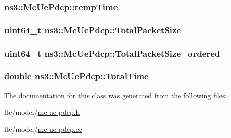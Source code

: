 \subsubsection[{\texorpdfstring{temp\+Time}{tempTime}}]{ ns3\+::\+Mc\+Ue\+Pdcp\+::temp\+Time\hspace{0.3cm}{\ttfamily [private]}}\hypertarget{classns3_1_1McUePdcp_a00eedb0b6b12304981937ffd8f153f1c}{}\label{classns3_1_1McUePdcp_a00eedb0b6b12304981937ffd8f153f1c}
\subsubsection[{\texorpdfstring{Total\+Packet\+Size}{TotalPacketSize}}]{\setlength{\rightskip}{0pt plus 5cm}uint64\+\_\+t ns3\+::\+Mc\+Ue\+Pdcp\+::\+Total\+Packet\+Size\hspace{0.3cm}{\ttfamily [private]}}\hypertarget{classns3_1_1McUePdcp_a5fe66d567481a6564a7d889cdf49da00}{}\label{classns3_1_1McUePdcp_a5fe66d567481a6564a7d889cdf49da00}
\subsubsection[{\texorpdfstring{Total\+Packet\+Size\+\_\+ordered}{TotalPacketSize_ordered}}]{\setlength{\rightskip}{0pt plus 5cm}uint64\+\_\+t ns3\+::\+Mc\+Ue\+Pdcp\+::\+Total\+Packet\+Size\+\_\+ordered\hspace{0.3cm}{\ttfamily [private]}}\hypertarget{classns3_1_1McUePdcp_a170d7342cb9d9fe7d213ae4a8d946d9c}{}\label{classns3_1_1McUePdcp_a170d7342cb9d9fe7d213ae4a8d946d9c}
\subsubsection[{\texorpdfstring{Total\+Time}{TotalTime}}]{\setlength{\rightskip}{0pt plus 5cm}double ns3\+::\+Mc\+Ue\+Pdcp\+::\+Total\+Time\hspace{0.3cm}{\ttfamily [private]}}\hypertarget{classns3_1_1McUePdcp_a490ce73b120d8f2b876182f4390f554a}{}\label{classns3_1_1McUePdcp_a490ce73b120d8f2b876182f4390f554a}


The documentation for this class was generated from the following files\+:\begin{DoxyCompactItemize}
\item 
lte/model/\hyperlink{lte_2model_2mc-ue-pdcp_8h}{mc-\/ue-\/pdcp.\+h}\item 
lte/model/\hyperlink{lte_2model_2mc-ue-pdcp_8cc}{mc-\/ue-\/pdcp.\+cc}\end{DoxyCompactItemize}
